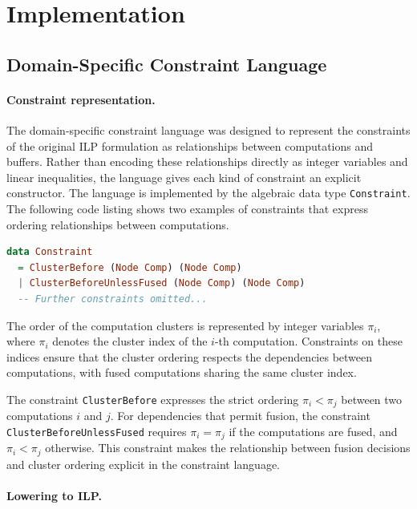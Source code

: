 \section{Implementation}
\label{sec:implementation}

\subsection{Domain-Specific Constraint Language}

\paragraph{Constraint representation.}

The domain-specific constraint language was designed to represent the constraints of the original ILP formulation as relationships between computations and buffers.
Rather than encoding these relationships directly as integer variables and linear inequalities, the language gives each kind of constraint an explicit constructor.
The language is implemented by the algebraic data type \texttt{Constraint}.
The following code listing shows two examples of constraints that express ordering relationships between computations.

\begin{lstlisting}[language=Haskell]
data Constraint
  = ClusterBefore (Node Comp) (Node Comp)
  | ClusterBeforeUnlessFused (Node Comp) (Node Comp)
  -- Further constraints omitted...
\end{lstlisting}

The order of the computation clusters is represented by integer variables $\pi_i$, where $\pi_i$ denotes the cluster index of the $i$-th computation.
Constraints on these indices ensure that the cluster ordering respects the dependencies between computations, with fused computations sharing the same cluster index.

The constraint \texttt{ClusterBefore} expresses the strict ordering $\pi_i < \pi_j$ between two computations $i$ and $j$.
For dependencies that permit fusion, the constraint \texttt{ClusterBeforeUnlessFused} requires $\pi_i = \pi_j$ if the computations are fused, and $\pi_i < \pi_j$ otherwise.
This constraint makes the relationship between fusion decisions and cluster ordering explicit in the constraint language.

\paragraph{Lowering to ILP.}


